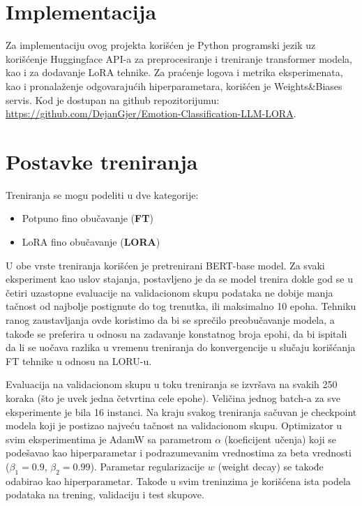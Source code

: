\documentclass{article}
\theoremstyle{definition}
\begin{document}
	\section{Implementacija}
	Za implementaciju ovog projekta korišćen je Python programski jezik uz 
	korišćenje Huggingface API-a za preprocesiranje i treniranje transformer 
	modela, kao i za dodavanje LoRA tehnike. Za praćenje logova i metrika
	eksperimenata, kao i pronalaženje odgovarajućih hiperparametara,
	 korišćen je Weights\&Biases servis. Kod je dostupan na github 
	 repozitorijumu:  \\
	 \url{https://github.com/DejanGjer/Emotion-Classification-LLM-LORA}.

	\section{Postavke treniranja}
	Treniranja se mogu podeliti u dve kategorije:
	\begin{itemize}
		\item Potpuno fino obučavanje (\textbf{FT}) 
		\item LoRA fino obučavanje (\textbf{LORA})
	\end{itemize}
	U obe vrste treniranja korišćen je pretrenirani BERT-base model. Za svaki
	eksperiment kao uslov stajanja, postavljeno je da se model trenira dokle
	god se u četiri uzastopne evaluacije na validacionom skupu podataka ne
	dobije manja tačnost od najbolje postignute do tog trenutka, ili maksimalno
	10 epoha. Tehniku ranog zaustavljanja ovde koristimo da bi se sprečilo
	preobučavanje modela, a takođe se preferira u odnosu na zadavanje 
	konstatnog broja epohi, da bi ispitali da li se uočava razlika u 
	vremenu treniranja do konvergencije u slučaju korišćanja FT tehnike u 
	odnosu na LORU-u.

	Evaluacija na validacionom skupu u toku treniranja se izvršava na
	svakih 250 koraka (što je uvek jedna četvrtina cele epohe). Veličina jednog
	batch-a za sve eksperimente je bila 16 instanci. Na kraju svakog treniranja
	sačuvan je checkpoint modela koji je postizao najveću tačnost na validacionom
	skupu. Optimizator u svim eksperimentima je AdamW sa parametrom $\alpha$
	(koeficijent učenja) koji se podešavao kao hiperparametar i podrazumevanim 
	vrednostima za beta vrednosti ($\beta_1=0.9$, $\beta_2=0.99$). Parametar
	regularizacije $w$ (weight decay) se takođe odabirao kao hiperparametar.
	Takođe u svim treninzima je korišćena ista podela podataka na trening, 
	validaciju i test skupove.
\end{document}

